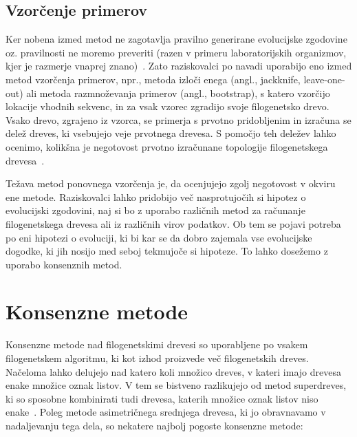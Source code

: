 \documentclass[a4paper, 12pt]{book}
\begin{document}
\subsection{Vzorčenje primerov}

Ker nobena izmed metod ne zagotavlja pravilno generirane evolucijske zgodovine 
oz. pravilnosti ne moremo preveriti (razen v primeru laboratorijskih organizmov, 
kjer je razmerje vnaprej znano)~\cite{phy}. Zato raziskovalci po navadi uporabijo eno 
izmed metod vzorčenja primerov, npr., metoda izloči enega (angl., jackknife, leave-one-out) ali 
metoda razmnoževanja primerov (angl., bootstrap), s katero vzorčijo 
lokacije vhodnih sekvenc, in za vsak vzorec zgradijo svoje filogenetsko drevo. 
Vsako drevo, zgrajeno iz vzorca, se primerja s prvotno pridobljenim in izračuna 
se delež dreves, ki vsebujejo veje prvotnega drevesa. S pomočjo teh deležev 
lahko ocenimo, kolikšna je negotovost prvotno izračunane topologije 
filogenetskega drevesa~\cite{fel}.   

Težava metod ponovnega vzorčenja je, da ocenjujejo zgolj negotovost v okviru 
ene metode. Raziskovalci lahko pridobijo več nasprotujočih si hipotez o evolucijski 
zgodovini, naj si bo z uporabo različnih metod za računanje filogenetskega drevesa 
ali iz različnih virov podatkov. Ob tem se pojavi potreba po eni hipotezi o evoluciji, 
ki bi kar se da dobro zajemala vse evolucijske dogodke, ki jih nosijo med seboj 
tekmujoče si hipoteze. To lahko dosežemo z uporabo konsenznih metod.

\section{Konsenzne metode}
Konsenzne metode nad filogenetskimi drevesi so uporabljene po vsakem filogenetskem
algoritmu, ki kot izhod proizvede več filogenetskih dreves. Nače\-lo\-ma lahko delujejo 
nad katero koli množico dreves, v kateri imajo drevesa enake množice oznak listov. 
V tem se bistveno razlikujejo od metod superdreves, ki so sposobne kombinirati 
tudi drevesa, katerih množice oznak listov niso enake~\cite{bw}. Poleg metode 
asimetričnega srednjega drevesa, ki jo obravnavamo v nadaljevanju tega dela, 
so nekatere najbolj pogoste konsenzne metode:
\end{document}
